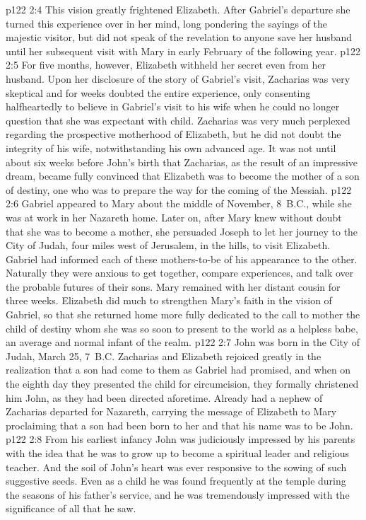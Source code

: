 \vs p122 2:4 This vision greatly frightened Elizabeth. After Gabriel’s departure she turned this experience over in her mind, long pondering the sayings of the majestic visitor, but did not speak of the revelation to anyone save her husband until her subsequent visit with Mary in early February of the following year.
\pc \vs p122 2:5 For five months, however, Elizabeth withheld her secret even from her husband. Upon her disclosure of the story of Gabriel’s visit, Zacharias was very skeptical and for weeks doubted the entire experience, only consenting halfheartedly to believe in Gabriel’s visit to his wife when he could no longer question that she was expectant with child. Zacharias was very much perplexed regarding the prospective motherhood of Elizabeth, but he did not doubt the integrity of his wife, notwithstanding his own advanced age. It was not until about six weeks before John’s birth that Zacharias, as the result of an impressive dream, became fully convinced that Elizabeth was to become the mother of a son of destiny, one who was to prepare the way for the coming of the Messiah.
\vs p122 2:6 Gabriel appeared to Mary about the middle of November, 8~B.C., while she was at work in her Nazareth home. Later on, after Mary knew without doubt that she was to become a mother, she persuaded Joseph to let her journey to the City of Judah, four miles west of Jerusalem, in the hills, to visit Elizabeth. Gabriel had informed each of these mothers\hyp{}to\hyp{}be of his appearance to the other. Naturally they were anxious to get together, compare experiences, and talk over the probable futures of their sons. Mary remained with her distant cousin for three weeks. Elizabeth did much to strengthen Mary’s faith in the vision of Gabriel, so that she returned home more fully dedicated to the call to mother the child of destiny whom she was so soon to present to the world as a helpless babe, an average and normal infant of the realm.
\pc \vs p122 2:7 John was born in the City of Judah, March 25, 7~B.C. Zacharias and Elizabeth rejoiced greatly in the realization that a son had come to them as Gabriel had promised, and when on the eighth day they presented the child for circumcision, they formally christened him John, as they had been directed aforetime. Already had a nephew of Zacharias departed for Nazareth, carrying the message of Elizabeth to Mary proclaiming that a son had been born to her and that his name was to be John.
\vs p122 2:8 From his earliest infancy John was judiciously impressed by his parents with the idea that he was to grow up to become a spiritual leader and religious teacher. And the soil of John’s heart was ever responsive to the sowing of such suggestive seeds. Even as a child he was found frequently at the temple during the seasons of his father’s service, and he was tremendously impressed with the significance of all that he saw.
